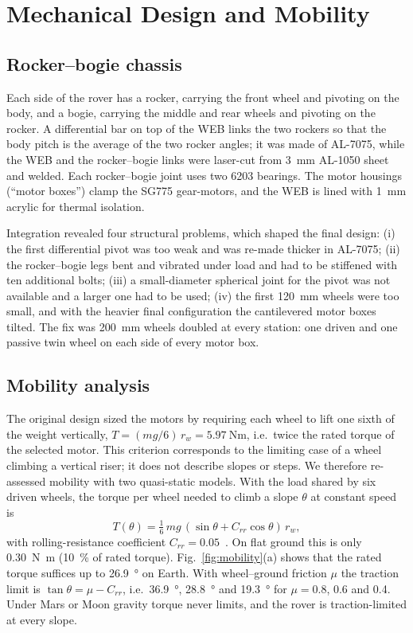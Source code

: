 \documentclass[conference]{IEEEtran}
\begin{document}
\section{Mechanical Design and Mobility}
\label{sec:mech}
\subsection{Rocker--bogie chassis}
Each side of the rover has a rocker, carrying the front wheel and pivoting on the body, and a bogie, carrying the middle and rear wheels and pivoting on the rocker. A differential bar on top of the WEB links the two rockers so that the body pitch is the average of the two rocker angles; it was made of AL-7075, while the WEB and the rocker--bogie links were laser-cut from \SI{3}{\milli\metre} AL-1050 sheet and welded. Each rocker--bogie joint uses two 6203 bearings. The motor housings (``motor boxes'') clamp the SG775 gear-motors, and the WEB is lined with \SI{1}{\milli\metre} acrylic for thermal isolation.

Integration revealed four structural problems, which shaped the final design: (i) the first differential pivot was too weak and was re-made thicker in AL-7075; (ii) the rocker--bogie legs bent and vibrated under load and had to be stiffened with ten additional bolts; (iii) a small-diameter spherical joint for the pivot was not available and a larger one had to be used; (iv) the first \SI{120}{\milli\metre} wheels were too small, and with the heavier final configuration the cantilevered motor boxes tilted. The fix was \SI{200}{\milli\metre} wheels doubled at every station: one driven and one passive twin wheel on each side of every motor box.

\subsection{Mobility analysis}
The original design sized the motors by requiring each wheel to lift one sixth of the weight vertically, $T = (mg/6)\,r_w = \SI{5.97}{\newton\metre}$, i.e.\ twice the rated torque of the selected motor. This criterion corresponds to the limiting case of a wheel climbing a vertical riser; it does not describe slopes or steps. We therefore re-assessed mobility with two quasi-static models. With the load shared by six driven wheels, the torque per wheel needed to climb a slope $\theta$ at constant speed is
\begin{equation}
T(\theta) = \tfrac{1}{6}\,m g\,(\sin\theta + C_{rr}\cos\theta)\,r_w,
\label{eq:grade}
\end{equation}
with rolling-resistance coefficient $C_{rr}=0.05$~\cite{wong2008}. On flat ground this is only \SI{0.30}{\newton\metre} (\SI{10}{\percent} of rated torque). Fig.~\ref{fig:mobility}(a) shows that the rated torque suffices up to \SI{26.9}{\degree} on Earth. With wheel--ground friction $\mu$ the traction limit is $\tan\theta=\mu-C_{rr}$, i.e.\ \SI{36.9}{\degree}, \SI{28.8}{\degree} and \SI{19.3}{\degree} for $\mu = 0.8$, 0.6 and 0.4. Under Mars or Moon gravity torque never limits, and the rover is traction-limited at every slope.
\end{document}
